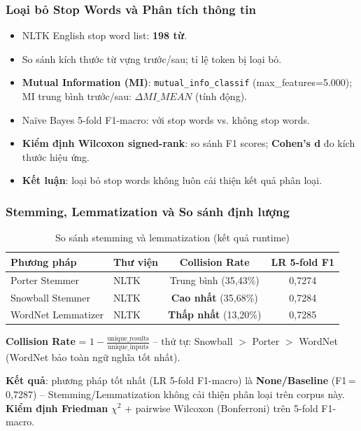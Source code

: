 \documentclass[12pt,a4paper]{article}
\let\oldtextbf\textbf
\renewcommand{\textbf}[1]{\oldtextbf{\textcolor{hcmublue}{#1}}}
\begin{document}
\subsubsection{Loại bỏ Stop Words và Phân tích thông tin}

\begin{itemize}
    \item NLTK English stop word list: \textbf{198 từ}.
    \item So sánh kích thước từ vựng trước/sau; tỉ lệ token bị loại bỏ.
    \item \textbf{Mutual Information (MI)}: \texttt{mutual\_info\_classif} (max\_features=5.000); MI trung bình trước/sau: $\Delta MI\_MEAN$ (tính động).
    \item Naïve Bayes 5-fold F1-macro: với stop words vs. không stop words.
    \item \textbf{Kiểm định Wilcoxon signed-rank}: so sánh F1 scores; \textbf{Cohen's d} đo kích thước hiệu ứng.
    \item \textbf{Kết luận}: loại bỏ stop words không luôn cải thiện kết quả phân loại.
\end{itemize}

\subsubsection{Stemming, Lemmatization và So sánh định lượng}

\begin{table}[H]
\centering
\begin{tabular}{|l|l|c|c|}
\hline
\textbf{Phương pháp} & \textbf{Thư viện} & \textbf{Collision Rate} & \textbf{LR 5-fold F1} \\ \hline
Porter Stemmer   & NLTK & Trung bình (35{,}43\%) & 0{,}7274 \\ \hline
Snowball Stemmer & NLTK & \textbf{Cao nhất} (35{,}68\%) & 0{,}7284 \\ \hline
WordNet Lemmatizer & NLTK & \textbf{Thấp nhất} (13{,}20\%) & 0{,}7285 \\ \hline
\end{tabular}
\caption{So sánh stemming và lemmatization (kết quả runtime)}
\label{tab:stemlem}
\end{table}

\textbf{Collision Rate} = $1 - \frac{\text{unique\_results}}{\text{unique\_inputs}}$ -- thứ tự: Snowball $>$ Porter $>$ WordNet (WordNet bảo toàn ngữ nghĩa tốt nhất).

\textbf{Kết quả}: phương pháp tốt nhất (LR 5-fold F1-macro) là \textbf{None/Baseline} (F1\,=\,0{,}7287) -- Stemming/Lemmatization không cải thiện phân loại trên corpus này. \textbf{Kiểm định Friedman} $\chi^2$ + pairwise Wilcoxon (Bonferroni) trên 5-fold F1-macro.
\end{document}
